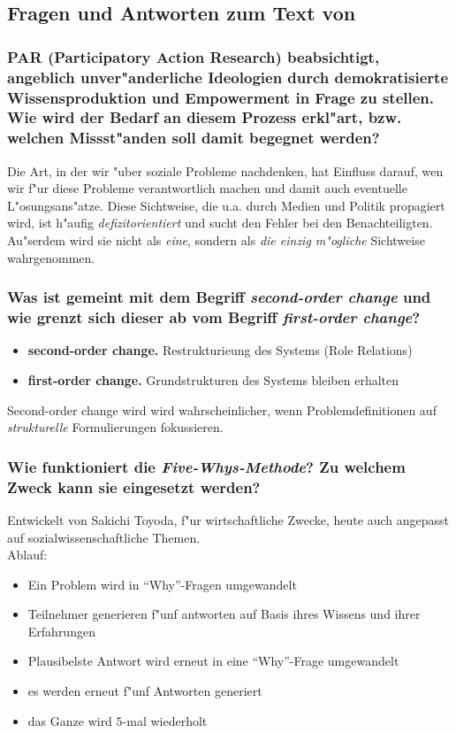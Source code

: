 \subsection{Fragen und Antworten zum Text von \textcite{kohfeldt_five_2012-1}}
\subsubsection{PAR (Participatory Action Research) beabsichtigt, angeblich unver"anderliche Ideologien durch demokratisierte Wissensproduktion und Empowerment in Frage zu stellen. Wie wird der Bedarf an diesem Prozess erkl"art, bzw. welchen Missst"anden soll damit begegnet werden?}
Die Art, in der wir "uber soziale Probleme nachdenken, hat Einfluss darauf, wen wir f"ur diese Probleme verantwortlich machen und damit auch eventuelle L"osungsans"atze. Diese Sichtweise, die u.a. durch Medien und Politik propagiert wird, ist h"aufig \emph{defizitorientiert} und sucht den Fehler bei den Benachteiligten. Au"serdem wird sie nicht als \emph{eine}, sondern als \emph{die einzig m"ogliche} Sichtweise wahrgenommen.

\subsubsection{Was ist gemeint mit dem Begriff \emph{second-order change} und wie grenzt sich dieser ab vom Begriff \emph{first-order change}?}
\begin{itemize}
        \item \textbf{second-order change.} Restrukturieung des Systems (Role Relations)
        \item \textbf{first-order change.} Grundstrukturen des Systems bleiben erhalten
\end{itemize}

Second-order change wird wird wahrscheinlicher, wenn Problemdefinitionen auf \emph{strukturelle} Formulierungen fokussieren.

\subsubsection{Wie funktioniert die \emph{Five-Whys-Methode}? Zu welchem Zweck kann sie eingesetzt werden?}
Entwickelt von Sakichi Toyoda, f"ur wirtschaftliche Zwecke, heute auch angepasst auf sozialwissenschaftliche Themen.\\
Ablauf:
\begin{itemize}
        \item Ein Problem wird in ``Why''-Fragen umgewandelt
        \item Teilnehmer generieren f"unf antworten auf Basis ihres Wissens und ihrer Erfahrungen
        \item Plausibelste Antwort wird erneut in eine ``Why''-Frage umgewandelt
        \item es werden erneut f"unf Antworten generiert
        \item das Ganze wird $5$-mal wiederholt
\end{itemize}

